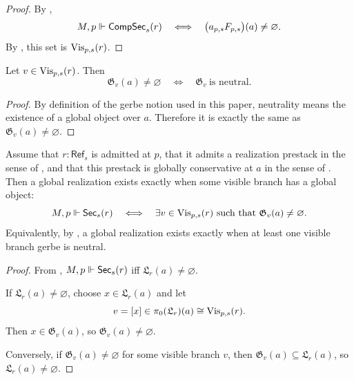 \begin{proof}
By ,
\[
M,p\Vdash \mathsf{CompSec}_s(r)
\quad\Longleftrightarrow\quad
\bigl(a_{p,s}F_{p,s}\bigr)(a)\neq\varnothing.
\]
By , this set is $\mathrm{Vis}_{p,s}(r)$.
\end{proof}

\begin{lemma}\label{lem:terminal-fibre-neutrality}
Let $v\in \mathrm{Vis}_{p,s}(r)$. Then
\[
\mathfrak G_v(a)\neq\varnothing
\quad\Longleftrightarrow\quad
\mathfrak G_v\ \text{is neutral}.
\]
\end{lemma}

\begin{proof}
By definition of the gerbe notion used in this paper, neutrality means the existence of a global object over $a$. Therefore it is exactly the same as $\mathfrak G_v(a)\neq\varnothing$.
\end{proof}

\begin{proposition}\label{prop:global-sections-vs-neutral-components}
Assume that $r:\mathsf{Ref}_s$ is admitted at $p$, that it admits a realization prestack in the sense of , and that this prestack is globally conservative at $a$ in the sense of . Then a global realization exists exactly when some visible branch has a global object:
\[
M,p\Vdash \mathsf{Sec}_s(r)
\quad\Longleftrightarrow\quad
\exists v\in \mathrm{Vis}_{p,s}(r)\ \text{such that}\ \mathfrak G_v(a)\neq\varnothing.
\]
Equivalently, by , a global realization exists exactly when at least one visible branch gerbe is neutral.
\end{proposition}

\begin{proof}
From , $M,p\Vdash \mathsf{Sec}_s(r)$ iff $\mathfrak L_r(a)\neq\varnothing$.

If $\mathfrak L_r(a)\neq\varnothing$, choose $x\in \mathfrak L_r(a)$ and let
\[
v=[x]\in \pi_0(\mathfrak L_r)(a)\cong \mathrm{Vis}_{p,s}(r).
\]
Then $x\in \mathfrak G_v(a)$, so $\mathfrak G_v(a)\neq\varnothing$.

Conversely, if $\mathfrak G_v(a)\neq\varnothing$ for some visible branch $v$, then $\mathfrak G_v(a)\subseteq \mathfrak L_r(a)$, so $\mathfrak L_r(a)\neq\varnothing$.
\end{proof}

